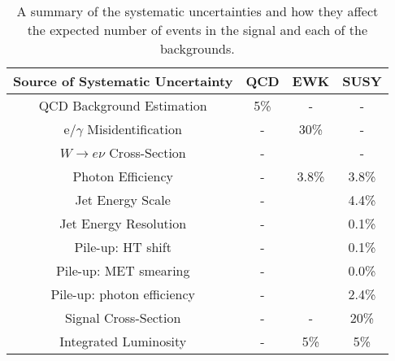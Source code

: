 \begin{table}
\begin{center}
\begin{tabular}{|c|c|c|c|}
\hline
{\bf Source of Systematic Uncertainty} & {\bf QCD} & {\bf EWK} & {\bf SUSY} \\
\hline
QCD Background Estimation & 5\% & - & - \\
\hline
e/$\gamma$ Misidentification & - & 30\% & - \\
\hline
$W\rightarrow e\nu$ Cross-Section & - &  & - \\
\hline
Photon Efficiency & - & 3.8\% & 3.8\% \\
\hline
Jet Energy Scale & - & & 4.4\% \\
\hline
Jet Energy Resolution & - & & 0.1\% \\
\hline
Pile-up: HT shift & - & & 0.1\% \\
\hline
Pile-up: MET smearing & - & & 0.0\% \\
\hline
Pile-up: photon efficiency & - & & 2.4\% \\
\hline
Signal Cross-Section & - & - & 20\% \\
\hline
Integrated Luminosity & - & 5\% & 5\% \\
\hline
\end{tabular}
\end{center}
\caption{A summary of the systematic uncertainties and how they affect the
expected number of events in the signal and each of the backgrounds.}
\label{tab:Systematics_Summary}
\end{table}
